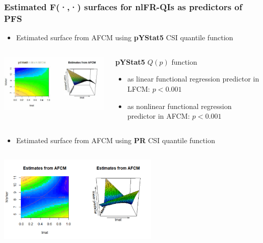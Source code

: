\documentclass[t,8pt]{beamer}
\begin{document}
\frame
   {\frametitle{Estimated F(·,·) surfaces for nlFR-QIs as predictors of PFS}  
   \begin{itemize}	
	\item Estimated surface from AFCM using  \color{red}  \textbf{pYStat5}  \color{black} CSI quantile function
	\end{itemize}		
	  \begin{columns}[T]
		\begin{column}{0.6\textwidth}
			 \includegraphics[width=3in] {Figures/pYStat5_afcm.pdf}
		\end{column}	
		\begin{column}{0.3\textwidth}
              	 \color{red}  \textbf{pYStat5}  \color{black} $Q(p)$ function\\
	         \begin{itemize}
                  \item as linear functional regression
	          predictor in LFCM: $p < 0.001$
		 \item as nonlinear functional regression
			predictor in AFCM: $p < 0.001$
             \end{itemize}  
		\end{column}
	\end{columns}		
   \begin{itemize}	
	\item Estimated surface from AFCM using  \color{red}  \textbf{PR}   \color{black} CSI quantile function
	\end{itemize}			
	  \begin{columns}[T]
		\begin{column}{0.6\textwidth}
	 \includegraphics[width=3in] {Figures/PR_afcm.pdf}

\end{column}
\end{columns}}
\end{document}
